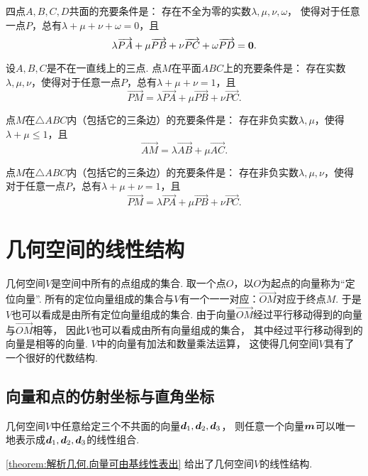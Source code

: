 \begin{theorem}
四点\(A,B,C,D\)共面的充要条件是：
存在不全为零的实数\(\lambda,\mu,\nu,\omega\)，
使得对于任意一点\(P\)，总有\(\lambda+\mu+\nu+\omega=0\)，且\[
\lambda \overrightarrow{PA} + \mu \overrightarrow{PB} + \nu \overrightarrow{PC} + \omega \overrightarrow{PD} = \boldsymbol{0}.
\]
\end{theorem}

\begin{theorem}
设\(A,B,C\)是不在一直线上的三点.
点\(M\)在平面\(ABC\)上的充要条件是：
存在实数\(\lambda,\mu,\nu\)，使得对于任意一点\(P\)，总有\(\lambda+\mu+\nu=1\)，且\[
\vec{PM} = \lambda \vec{PA} + \mu \vec{PB} + \nu \vec{PC}.
\]
\end{theorem}

\begin{theorem}
点\(M\)在\(\triangle ABC\)内（包括它的三条边）的充要条件是：
存在非负实数\(\lambda,\mu\)，使得\(\lambda+\mu\leqslant1\)，且\[
\vec{AM} = \lambda \vec{AB} + \mu \vec{AC}.
\]
\end{theorem}

\begin{theorem}
点\(M\)在\(\triangle ABC\)内（包括它的三条边）的充要条件是：
存在非负实数\(\lambda,\mu,\nu\)，使得对于任意一点\(P\)，总有\(\lambda+\mu+\nu=1\)，且\[
\vec{PM} = \lambda \vec{PA} + \mu \vec{PB} + \nu \vec{PC}.
\]
\end{theorem}

\section{几何空间的线性结构}
几何空间\(V\)是空间中所有的点组成的集合.
取一个点\(O\)，以\(O\)为起点的向量称为“定位向量”.
所有的定位向量组成的集合与\(V\)有一个一一对应：\(\vec{OM}\)对应于终点\(M\).
于是\(V\)也可以看成是由所有定位向量组成的集合.
由于向量\(\vec{OM}\)经过平行移动得到的向量与\(\vec{OM}\)相等，
因此\(V\)也可以看成由所有向量组成的集合，
其中经过平行移动得到的向量是相等的向量.
\(V\)中的向量有加法和数量乘法运算，
这使得几何空间\(V\)具有了一个很好的代数结构.

\subsection{向量和点的仿射坐标与直角坐标}
\begin{theorem}\label{theorem:解析几何.向量可由基线性表出}
几何空间\(V\)中任意给定三个不共面的向量\(\boldsymbol{d}_1,\boldsymbol{d}_2,\boldsymbol{d}_3\)，
则任意一个向量\(\boldsymbol{m}\)可以唯一地表示成\(\boldsymbol{d}_1,\boldsymbol{d}_2,\boldsymbol{d}_3\)的线性组合.
\end{theorem}
\cref{theorem:解析几何.向量可由基线性表出} 给出了几何空间\(V\)的线性结构.

